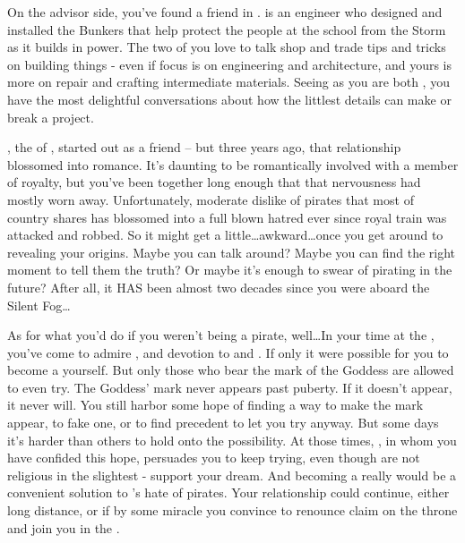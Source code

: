 \documentclass[char]{GL2020}
\begin{document}
On the advisor side, you've found a friend in \cBunker{}. \cBunker{} is an engineer who designed and installed the Bunkers that help protect the people at the school from the Storm as it builds in power. The two of you love to talk shop and trade tips and tricks on building things - even if \cBunker{\their} focus is on engineering and architecture, and yours is more on repair and crafting intermediate materials. Seeing as you are both \pShip{}, you have the most delightful conversations about how the littlest details can make or break a project. 

\cPrince{}, the \cPrince{\Heir} of \pFarm{}, started out as a friend -- but three years ago, that relationship blossomed into romance. It's daunting to be romantically involved with a member of royalty, but you've been together long enough that that nervousness had mostly worn away. Unfortunately, \cPrince{\their} moderate dislike of pirates that most of \cPrince{\their} country shares has blossomed into a full blown hatred ever since \cPrince{\their} royal train was attacked and \cPrince{\they} \cPrince{\were} robbed. So it might get a little\ldots awkward\ldots once you get around to revealing your origins. Maybe you can talk \cPrince{\them} around? Maybe you can find the right moment to tell them the truth? Or maybe it's enough to swear of pirating in the future? After all, it HAS been almost two decades since you were aboard the Silent Fog\ldots 

As for what you'd do if you weren't being a pirate, well\ldots In your time at the \pSc{}, you've come to admire \cFlowPriest{}, and \cFlowPriest{\their} devotion to \cEbb{} and \cFlow{}. If only it were possible for you to become a \cPirate{\cleric} yourself. But only those who bear the mark of the Goddess are allowed to even try. The Goddess' mark never appears past puberty. If it doesn't appear, it never will. You still harbor some hope of finding a way to make the mark appear, to fake one, or to find precedent to let you try anyway. But some days it's harder than others to hold onto the possibility. At those times, \cBunker{}, in whom you have confided this hope, persuades you to keep trying, even though \cBunker{\they} are not religious in the slightest - \cBunker{\they} support\cBunker{\plural} your dream. And becoming a \cPirate{\cleric} really would be a convenient solution to \cPrince{}'s hate of pirates. Your relationship could continue, either long distance, or if by some miracle you convince \cPrince{} to renounce \cPrince{\their} claim on the throne and join you in the \pShip{}.
\end{document}
